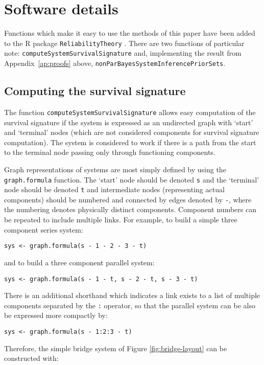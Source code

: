 \documentclass[12pt, a4paper]{elsarticle}
\begin{document}
\section{Software details}
\label{ap:software}

Functions which make it easy to use the methods of this paper
have been added to the \textsf{R} package \texttt{ReliabilityTheory} \citep{2015:aslett-RT}.
There are two functions of particular note: \texttt{computeSystemSurvivalSignature}
and, implementing the result from Appendix~\ref{ap:proofs} above, \texttt{nonParBayesSystemInferencePriorSets}.

\subsection{Computing the survival signature}

The function \texttt{computeSystemSurvivalSignature} allows easy 
computation of the survival signature if the system is expressed as an
undirected graph with `start' and `terminal' nodes (which are not
considered components for survival signature computation).  The system
is considered to work if there is a path from the start to the terminal
node passing only through functioning components.

Graph representations of systems are most simply defined by using the 
\texttt{graph.formula} function.  The `start' node should be denoted
\texttt{s} and the `terminal' node should be denoted \texttt{t} and
intermediate nodes (representing actual components) should be numbered and
connected by edges denoted by \texttt{-}, where the numbering denotes physically
distinct components.  Component numbers can be repeated to include
multiple links.  For example, to build a simple three component series
system:

\noindent\texttt{sys <- graph.formula(s\,-\,1\,-\,2\,-\,3\,-\,t)}

and to build a three component parallel system:

\noindent\texttt{sys <- graph.formula(s\,-\,1\,-\,t, s\,-\,2\,-\,t, s\,-\,3\,-\,t)}

There is an additional shorthand which indicates a link exists to a list of multiple components separated by the \texttt{:} operator, so that the parallel system can be also be expressed more compactly by:

\noindent\texttt{sys <- graph.formula(s\,-\,1:2:3\,-\,t)}

Therefore, the simple bridge system of Figure \ref{fig:bridge-layout} can be constructed with:
\end{document}
